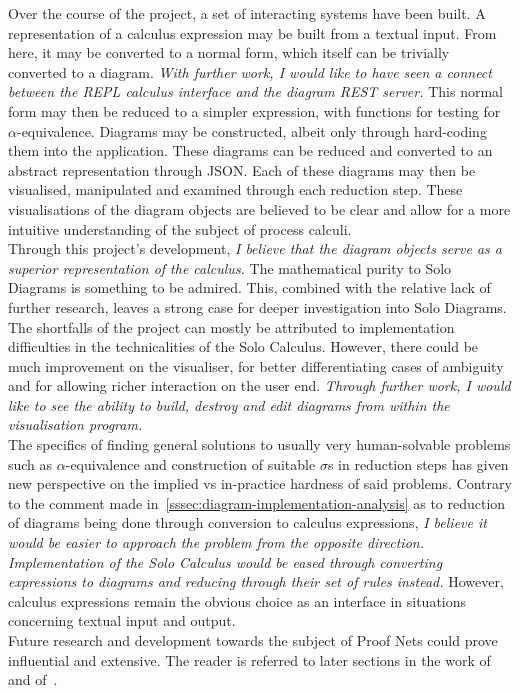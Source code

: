 Over the course of the project, a set of interacting systems have been built.
A representation of a calculus expression may be built from a textual input.
From here, it may be converted to a normal form, which itself can be trivially converted to a diagram.
\textit{With further work, I would like to have seen a connect between the REPL calculus interface and the diagram REST server.}
This normal form may then be reduced to a simpler expression, with functions for testing for $\alpha$-equivalence.
Diagrams may be constructed, albeit only through hard-coding them into the application.
These diagrams can be reduced and converted to an abstract representation through JSON.
Each of these diagrams may then be visualised, manipulated and examined through each reduction step.
These visualisations of the diagram objects are believed to be clear and allow for a more intuitive understanding of the subject of process calculi.\\

Through this project's development, \textit{I believe that the diagram objects serve as a superior representation of the calculus.}
The mathematical purity to Solo Diagrams is something to be admired.
This, combined with the relative lack of further research, leaves a strong case for deeper investigation into Solo Diagrams.\\

The shortfalls of the project can mostly be attributed to implementation difficulties in the technicalities of the Solo Calculus.
However, there could be much improvement on the visualiser, for better differentiating cases of ambiguity and for allowing richer interaction on the user end.
\textit{Through further work, I would like to see the ability to build, destroy and edit diagrams from within the visualisation program.}\\

The specifics of finding general solutions to usually very human-solvable problems such as $\alpha$-equivalence and construction of suitable $\sigma$s in reduction steps has given new perspective on the implied vs in-practice hardness of said problems.
Contrary to the comment made in~\ref{sssec:diagram-implementation-analysis} as to reduction of diagrams being done through conversion to calculus expressions, \textit{I believe it would be easier to approach the problem from the opposite direction.}
\textit{Implementation of the Solo Calculus would be eased through converting expressions to diagrams and reducing through their set of rules instead.}
However, calculus expressions remain the obvious choice as an interface in situations concerning textual input and output.\\

Future research and development towards the subject of Proof Nets could prove influential and extensive.
The reader is referred to later sections in the work of~\cite{solo-diagrams} and of~\cite{acyclic-solos}.
